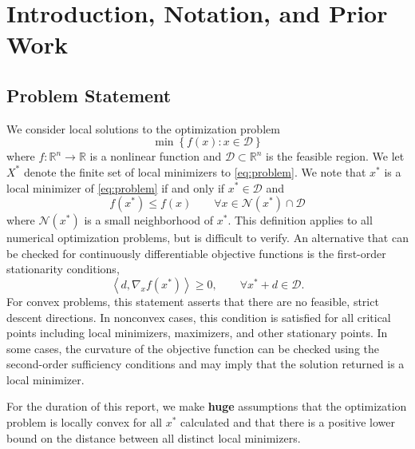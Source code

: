 \newcommand{\cA}{\mathcal{A}} %
\newcommand{\R}{\mathbb{R}} %
\newcommand{\cD}{\mathcal{D}} %
\newcommand{\cC}{\mathcal{C}} %
\newcommand{\Xs}{X^*} %
\newcommand{\cN}{\mathcal{N}} %


\section{Introduction, Notation, and Prior Work}
\label{sec:intro}

\subsection{Problem Statement}

We consider local solutions to the optimization problem
\begin{equation}
 \min\left\{f(x): x\in \cD\right\}
 \label{eq:problem}
\end{equation}
where $f:\R^n\rightarrow\R$ is a nonlinear function and $\cD\subset \R^n$
is the feasible region.  We let $\Xs$ denote the finite set of local 
minimizers to \eqref{eq:problem}.  We note that $x^*$ is a local 
minimizer of \eqref{eq:problem} if and only if $x^* \in \cD$ and
\begin{equation}
f(x^*) \leq f(x) \qquad \forall x \in \mathcal{N}(x^*) \cap \cD
\end{equation}
where $\mathcal{N}(x^*)$ is a small neighborhood of $x^*$.  This
definition applies to all numerical optimization problems, but
is difficult to verify.  An alternative that can be checked
for continuously differentiable objective functions is the
first-order stationarity conditions,
\begin{equation}
 \left \langle d, \nabla_x f(x^*)\right \rangle \geq 0, \qquad \forall 
x^*+d\in \cD.
\end{equation}
For convex problems, this statement asserts that there are no 
feasible, strict descent directions.  In nonconvex cases, this 
condition is satisfied for all critical points including local 
minimizers, maximizers, and other stationary points.  In some 
cases, the curvature of the objective function can be checked 
using the second-order sufficiency conditions and may imply 
that the solution returned is a local minimizer.  

For the duration of this report, we make {\bf huge} assumptions 
that the optimization problem is locally convex for all $x^*$ 
calculated and that there is a positive lower bound on the 
distance between all distinct local minimizers.

